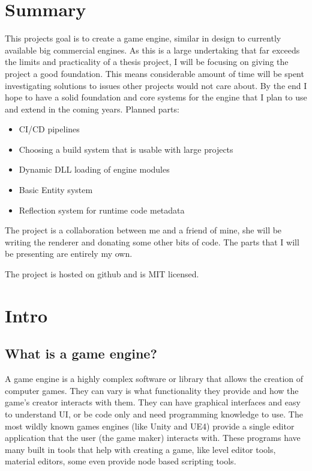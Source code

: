 \chapter{Summary}

This projects goal is to create a game engine, similar in design to currently available big commercial engines.
As this is a large undertaking that far exceeds the limits and practicality of a thesis project, I will be focusing on giving the project a good foundation. This means considerable amount of time will be spent investigating solutions to issues other projects would not care about. By the end I hope to have a solid foundation and core systems for the engine that I plan to use and extend in the coming years.
Planned parts:

\begin{itemize}
    \item CI/CD pipelines
    \item Choosing a build system that is usable with large projects
    \item Dynamic DLL loading of engine modules
    \item Basic Entity system
    \item Reflection system for runtime code metadata
\end{itemize}

The project is a collaboration between me and a friend of mine, she will be writing the renderer and donating some other bits of code. The parts that I will be presenting are entirely my own.

The project is hosted on github and is MIT licensed.


\chapter{Intro}

\section{What is a game engine?}
A game engine is a highly complex software or library that allows the creation of computer games. They can vary is what functionality they provide and how the game's creator interacts with them. They can have graphical interfaces and easy to understand UI, or be code only and need programming knowledge to use. The most wildly known games engines (like Unity and UE4) provide a single editor application that the user (the game maker) interacts with. These programs have many built in tools that help with creating a game, like level editor tools, material editors, some even provide node based scripting tools.

